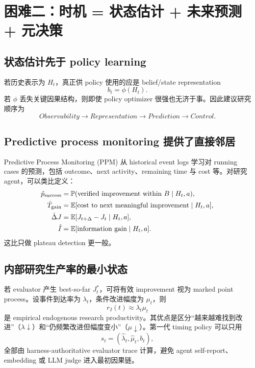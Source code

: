 \documentclass[11pt,a4paper]{ctexart}
\newcommand{\E}{\mathbb{E}}
\newcommand{\Pp}{\mathbb{P}}
\begin{document}
\section{困难二：时机 = 状态估计 + 未来预测 + 元决策}

\subsection{状态估计先于 policy learning}

若历史表示为 $H_t$，真正供 policy 使用的应是 belief/state representation
\begin{equation}
 b_t=\phi(H_t).
\end{equation}
若 $\phi$ 丢失关键因果结构，则即使 policy optimizer 很强也无济于事。因此建议研究顺序为
\begin{equation}
\boxed{Observability\to Representation\to Prediction\to Control.}
\end{equation}

\subsection{Predictive process monitoring 提供了直接邻居}

Predictive Process Monitoring (PPM) 从 historical event logs 学习对 running cases 的预测，包括 outcome、next activity、remaining time 与 cost 等\parencite{francescomarino2024ppm,verenich2019remaining}。对研究 agent，可以类比定义：
\begin{align}
\hat p_{\rm success} &= \Pp(\text{verified improvement within }B\mid H_t,a),\\
\hat T_{\rm gain} &= \E[\text{cost to next meaningful improvement}\mid H_t,a],\\
\hat \Delta J &= \E[J_{t+\Delta}-J_t\mid H_t,a],\\
\hat I &= \E[\text{information gain}\mid H_t,a].
\end{align}
这比只做 plateau detection 更一般。

\subsection{内部研究生产率的最小状态}

若 evaluator 产生 best-so-far $J_t^*$，可将有效 improvement 视为 marked point process。设事件到达率为 $\lambda_t$，条件改进幅度为 $\mu_t$，则
\begin{equation}
 r_I(t)\approx\lambda_t\mu_t
\end{equation}
是 empirical endogenous research productivity。其优点是区分“越来越难找到改进”（$\lambda\downarrow$）和“仍频繁改进但幅度变小”（$\mu\downarrow$）。第一代 timing policy 可以只用
\begin{equation}
 s_t=(\hat\lambda_t,\hat\mu_t,b_t),
\end{equation}
全部由 harness-authoritative evaluator trace 计算，避免 agent self-report、embedding 或 LLM judge 进入最初因果链。
\end{document}
